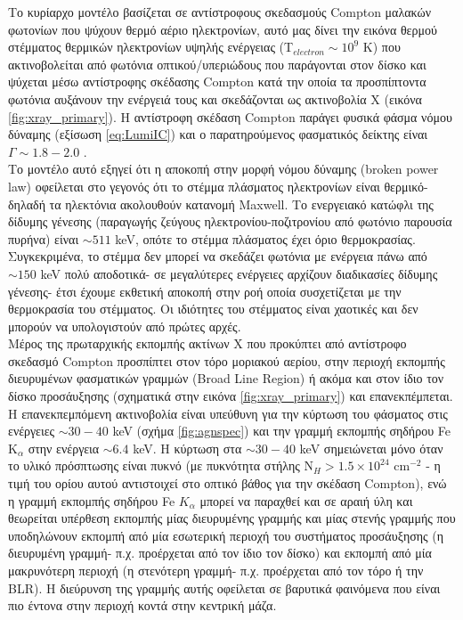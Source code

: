 Το κυρίαρχο μοντέλο βασίζεται σε αντίστροφους σκεδασμούς \textlatin{Compton} μαλακών φωτονίων που ψύχουν θερμό αέριο ηλεκτρονίων, αυτό μας δίνει την εικόνα θερμού στέμματος θερμικών ηλεκτρονίων υψηλής ενέργειας (T$_{electron} \sim 10^9$  K) που ακτινοβολείται από φωτόνια οπτικού/υπεριώδους που παράγονται στον δίσκο και ψύχεται μέσω αντίστροφης σκέδασης \textlatin{Compton} κατά την οποία τα προσπίπτοντα φωτόνια αυξάνουν την ενέργειά τους και σκεδάζονται ως ακτινοβολία Χ (εικόνα \ref{fig:xray_primary}). Η αντίστροφη σκέδαση \textlatin{Compton} παράγει φυσικά φάσμα νόμου δύναμης (εξίσωση \ref{eq:LumiIC}) και ο παρατηρούμενος φασματικός δείκτης είναι $\Gamma \sim 1.8-2.0$ \cite{1991ApJ}.\\    
Το μοντέλο αυτό εξηγεί ότι η αποκοπή στην μορφή νόμου δύναμης (\textlatin{broken power law}) οφείλεται στο γεγονός ότι το στέμμα πλάσματος ηλεκτρονίων είναι θερμικό- δηλαδή τα ηλεκτόνια ακολουθούν κατανομή \textlatin{Maxwell}. Το ενεργειακό κατώφλι της δίδυμης γένεσης (παραγωγής ζεύγους ηλεκτρονίου-ποζιτρονίου από φωτόνιο παρουσία πυρήνα) είναι $\sim 511$ \textlatin{keV}, οπότε το στέμμα πλάσματος έχει όριο θερμοκρασίας. Συγκεκριμένα, το στέμμα δεν μπορεί να σκεδάζει φωτόνια με ενέργεια πάνω από  $\sim 150$ \textlatin{keV} πολύ αποδοτικά- σε μεγαλύτερες ενέργειες αρχίζουν διαδικασίες δίδυμης γένεσης- έτσι έχουμε εκθετική αποκοπή στην ροή οποία συσχετίζεται με την θερμοκρασία του στέμματος. Οι ιδιότητες του στέμματος είναι χαοτικές και δεν μπορούν να υπολογιστούν από πρώτες αρχές\cite{Brandt}. \\
Μέρος της πρωταρχικής εκπομπής ακτίνων Χ που προκύπτει από αντίστροφο σκεδασμό \textlatin{Compton} προσπίπτει στον τόρο μοριακού αερίου, στην περιοχή εκπομπής διευρυμένων φασματικών γραμμών \textlatin{(Broad Line Region)} ή ακόμα και στον ίδιο τον δίσκο προσάυξησης (σχηματικά στην εικόνα \ref{fig:xray_primary}) και επανεκπέμπεται. Η επανεκπεμπόμενη ακτινοβολία είναι υπεύθυνη για την κύρτωση του φάσματος στις ενέργειες $\sim 30-40$ \textlatin{keV} (σχήμα \ref{fig:agnspec}) και την γραμμή εκπομπής σηδήρου \textlatin{Fe K$_\alpha$} στην ενέργεια $\sim 6.4 $ \textlatin{keV}. Η κύρτωση στα $\sim 30-40$ \textlatin{keV} σημειώνεται μόνο όταν το υλικό πρόσπτωσης είναι πυκνό (με πυκνότητα στήλης Ν$_{Η} >  1.5 \times  10^{24}$ \textlatin{cm}$^{-2}$ - η τιμή του ορίου αυτού αντιστοιχεί στο οπτικό βάθος για την σκέδαση \textlatin{Compton}), ενώ η γραμμή εκπομπής σηδήρου \textlatin{Fe $K_\alpha$} μπορεί να παραχθεί και σε αραιή ύλη και θεωρείται υπέρθεση εκπομπής μίας διευρυμένης γραμμής και μίας στενής γραμμής που υποδηλώνουν εκπομπή από μία εσωτερική περιοχή του συστήματος προσάυξησης (η διευρυμένη γραμμή- π.χ. προέρχεται από τον ίδιο τον δίσκο) και εκπομπή από μία μακρυνότερη περιοχή (η στενότερη γραμμή- π.χ. προέρχεται από τον τόρο ή την \textlatin{BLR}). Η διεύρυνση της γραμμής αυτής οφείλεται σε βαρυτικά φαινόμενα που είναι πιο έντονα στην περιοχή κοντά στην κεντρική μάζα.\\
